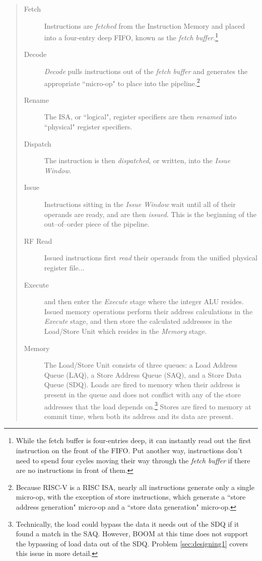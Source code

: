 \begin{quote}
\begin{description}
\item[Fetch]  Instructions are {\em fetched} from the Instruction Memory and placed into a four-entry deep FIFO, known as the {\em fetch buffer}.\footnote{While the fetch buffer is four-entries deep, it can instantly read out the first instruction on the front of the FIFO.  Put another way, instructions don't need to spend four cycles moving their way through the {\em fetch buffer} if there are no instructions in front of them.}
\item[Decode]
{\em Decode} pulls instructions out of the {\em fetch buffer} and generates the appropriate ``micro-op" to place into the pipeline.\footnote{Because RISC-V is a RISC ISA, nearly all instructions generate only a single micro-op, with the exception of store instructions, which generate a ``store address generation" micro-op and a ``store data generation" micro-op.} 

\item[Rename]
 The ISA, or ``logical", register specifiers are then {\em renamed} into ``physical" register specifiers.
  
\item[Dispatch] The instruction is then {\em dispatched}, or written, into the {\em Issue Window}.  
 
\item[Issue]   Instructions sitting in the {\em Issue Window} wait until all of their operands are ready, and are then {\em issued}.  This is the beginning of the out--of--order piece of the pipeline.
\item[RF Read]  Issued instructions first {\em read} their operands from the unified physical register file... 
\item[Execute] and then enter the {\em Execute} stage where the integer ALU resides.  Issued memory operations perform their address calculations in the {\em Execute} stage, and then store the calculated addresses in the Load/Store Unit which resides in the {\em Memory} stage.  
 
\item[Memory]  The Load/Store Unit consists of three queues: a Load Address Queue (LAQ), a Store Address Queue (SAQ), and a Store Data Queue (SDQ).  Loads are fired to memory when their address is present in the queue and does not conflict with any of the store addresses that the load depends on.\footnote{Technically, the load could bypass the data it needs out of the SDQ if it found a match in the SAQ.  However, BOOM at this time does not support the bypassing of load data out of the SDQ.  Problem \ref{sec:designing1} covers this issue in more detail.} Stores are fired to memory at commit time, when both its address and its data are present.  
 

\end{description}
\end{quote}
